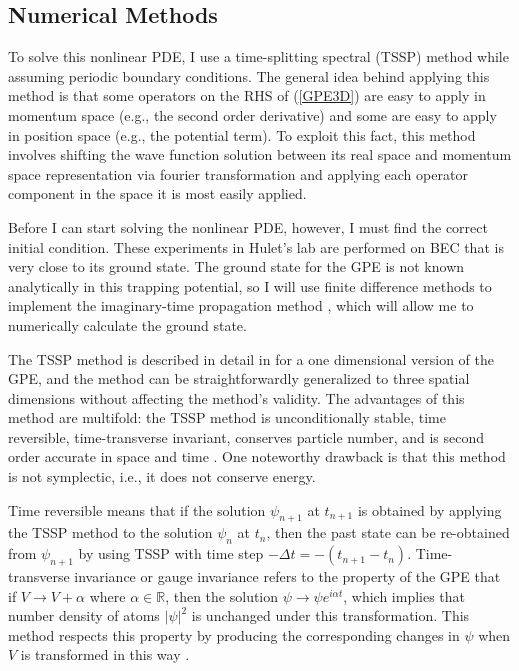 \documentclass[12]{article}
\begin{document}
\subsection{Numerical Methods}
To solve this nonlinear PDE, I use a time-splitting spectral (TSSP) method while assuming periodic boundary conditions. The general idea behind applying this method is that some operators on the RHS of (\ref{GPE3D}) are easy to apply in momentum space (e.g., the second order derivative) and some are easy to apply in position space (e.g., the potential term). To exploit this fact, this method involves shifting the wave function solution between its real space and momentum space representation via fourier transformation and applying each operator component in the space it is most easily applied. 

Before I can start solving the nonlinear PDE, however, I must find the correct initial condition. These experiments in Hulet's lab are performed on BEC that is very close to its ground state. The ground state for the GPE is not known analytically in this trapping potential, so I will use finite difference methods to implement the imaginary-time propagation method \cite{chiofalo2000ground, muruganandam2009fortran}, which will allow me to numerically calculate the ground state.

The TSSP method is described in detail in \cite{bao2003numerical} for a one dimensional version of the GPE, and the method can be straightforwardly generalized to three spatial dimensions without affecting the method's validity. The advantages of this method are multifold: the TSSP method is unconditionally stable, time reversible, time-transverse invariant, conserves particle number, and is second order accurate in space and time \cite{bao2003numerical}. One noteworthy drawback is that this method is not symplectic, i.e., it does not conserve energy.

Time reversible means that if the solution $\psi_{n+1}$ at $t_{n+1}$ is obtained by applying the TSSP method to the solution $\psi_n$ at $t_n$, then the past state can be re-obtained from $\psi_{n+1}$ by using TSSP with time step $-\Delta t = -(t_{n+1} - t_n)$. Time-transverse invariance or gauge invariance refers to the property of the GPE that if $V \rightarrow V + \alpha$ where $\alpha \in \mathbb{R}$, then the solution $\psi \rightarrow \psi e^{i\alpha t}$, which implies that number density of atoms $|\psi|^2$ is unchanged under this transformation. This method respects this property by producing the corresponding changes in $\psi$ when $V$ is transformed in this way \cite{antoine2013computational}.
\end{document}
